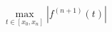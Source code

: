 \documentclass[preview]{standalone}
\begin{document}
\begin{align*}
\max_{t \in [x_0, x_n]} |f^{(n+1)}(t)|
\end{align*}
\end{document}
